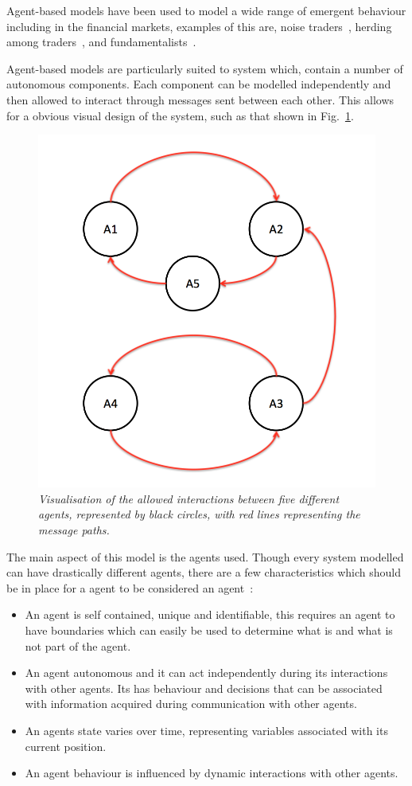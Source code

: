 \documentclass{article}
\begin{document}
Agent-based models have been used to model a wide range of emergent behaviour including in the financial markets, examples of this are, noise traders~\cite{abmnoisetraders}, herding among traders~\cite{abmherding}, and fundamentalists~\cite{abmfundemetilists}.

Agent-based models are particularly suited to system which, contain a number of autonomous components. Each component can be modelled independently and then allowed to interact through messages sent between each other. This allows for a obvious visual design of the system, such as that shown in Fig.~\ref{fig:abmii}.
\begin{figure}[H]
	\centering
	\includegraphics[scale=0.5]{abmii}
	\caption{\it Visualisation of the allowed interactions between five different agents, represented by black circles, with red lines representing the message paths.}
	\label{fig:abmii}
\end{figure} 
The main aspect of this model is the agents used. Though every system modelled can have drastically different agents, there are a few characteristics which should be in place for a agent to be considered an agent~\cite{MN2010, abmtsd}:
\begin{itemize}
   \item An agent is self contained, unique and identifiable, this requires an agent to have boundaries which can easily be used to determine what is and what is not part of the agent. 
   \item An agent autonomous and it can act independently during its interactions with other agents. Its has behaviour and decisions that can be associated with information acquired  during communication with other agents. 
   \item An agents state varies over time, representing variables associated with its current position. 
   \item An agent behaviour is influenced by dynamic interactions with other agents. 
\end{itemize}
\end{document}
